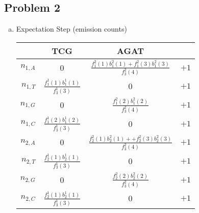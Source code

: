 \documentclass[11pt]{extarticle} %
\begin{document}
\subsection*{Problem 2}
\begin{enumerate}[(a)]
\item Expectation Step (emission counts) \\
\begin{table}[H]
\centering
\begin{tabular}{r|c|cl}
  \hline
 & TCG & AGAT & \\ 
  \hline
  $n_{1,A}$ & $0$ 					& $\frac{f_1^2(1)b_1^2(1) + f_1^2(3)b_1^2(3)}{f_3^2(4)}$ 	& $ +1$  \\ 
  $n_{1,T}$ & $\frac{f_1^1(1)b_1^1(1)}{f_3^1(3)}$ 	& $0$ 								& $ +1$  \\ 
  $n_{1,G}$ & $0$ 					& $\frac{f_1^2(2)b_1^2(2)}{f_3^2(4)}$ 				& $ +1$  \\ 
  $n_{1,C}$ & $\frac{f_1^1(2)b_1^1(2)}{f_3^1(3)}$ 	& $0$ 								& $ +1$  \\ 
  $n_{2,A}$ & $0$ 					& $\frac{f_2^2(1)b_2^2(1) + + f_2^2(3)b_2^2(3)}{f_3^2(4)}$ 	& $ +1$  \\ 
  $n_{2,T}$ & $\frac{f_2^1(1)b_2^1(1)}{f_3^1(3)}$ 	& $0$		 						& $ +1$  \\ 
  $n_{2,G}$ & $0$ 					& $\frac{f_2^2(2)b_2^2(2)}{f_3^2(4)}$ 				& $ +1$  \\ 
  $n_{2,C}$ & $\frac{f_2^1(1)b_2^1(1)}{f_3^1(3)}$ 	& $0$		 						& $ +1$  \\ 
   \hline
\end{tabular}
\end{table}


\end{enumerate}
\end{document}
